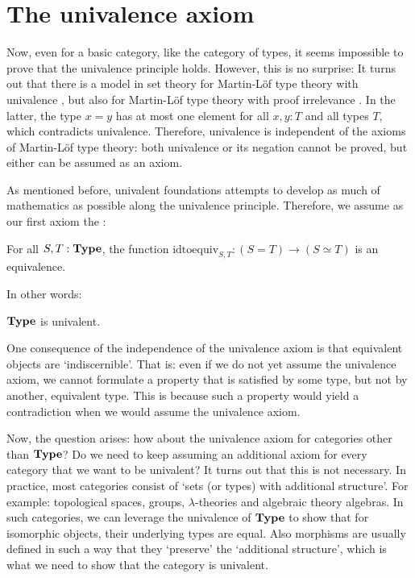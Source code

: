 \section{The univalence axiom}
Now, even for a basic category, like the category of types, it seems impossible to prove that the univalence principle holds. However, this is no surprise: It turns out that there is a model in set theory for Martin-Löf type theory with univalence \autocite{simplicial-set-model}, but also for Martin-Löf type theory with proof irrelevance \autocite{proof-irrelevant-model}. In the latter, the type $ x = y $ has at most one element for all $ x, y : T $ and all types $ T $, which contradicts univalence. Therefore, univalence is independent of the axioms of Martin-Löf type theory: both univalence or its negation cannot be proved, but either can be assumed as an axiom.

As mentioned before, univalent foundations attempts to develop as much of mathematics as possible along the univalence principle. Therefore, we assume as our first axiom the :
\begin{axiom}
  For all $ S, T: \mathbf{Type} $, the function $ \mathrm{idtoequiv}_{S, T}: (S = T) \to (S \simeq T) $ is an equivalence.
\end{axiom}
In other words:
\begin{axiom}
  $ \mathbf{Type} $ is univalent.
\end{axiom}

\begin{remark}
  One consequence of the independence of the univalence axiom is that equivalent objects are `indiscernible'. That is: even if we do not yet assume the univalence axiom, we cannot formulate a property that is satisfied by some type, but not by another, equivalent type. This is because such a property would yield a contradiction when we would assume the univalence axiom.
\end{remark}

Now, the question arises: how about the univalence axiom for categories other than $ \mathbf{Type} $? Do we need to keep assuming an additional axiom for every category that we want to be univalent? It turns out that this is not necessary. In practice, most categories consist of `sets (or types) with additional structure'. For example: topological spaces, groups, $ \lambda $-theories and algebraic theory algebras. In such categories, we can leverage the univalence of $ \mathbf{Type} $ to show that for isomorphic objects, their underlying types are equal. Also morphisms are usually defined in such a way that they `preserve' the `additional structure', which is what we need to show that the category is univalent.

